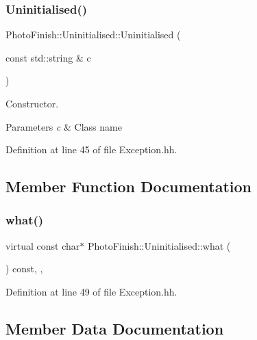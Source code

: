 \subsubsection{\texorpdfstring{Uninitialised()}{Uninitialised()}\hspace{0.1cm}{\footnotesize\ttfamily [2/2]}}
{\footnotesize\ttfamily Photo\+Finish\+::\+Uninitialised\+::\+Uninitialised (\begin{DoxyParamCaption}\item[{const std\+::string \&}]{c }\end{DoxyParamCaption})\hspace{0.3cm}{\ttfamily [inline]}}



Constructor. 


\begin{DoxyParams}{Parameters}
{\em c} & Class name \\
\hline
\end{DoxyParams}


Definition at line 45 of file Exception.\+hh.



\subsection{Member Function Documentation}
\mbox{\label{class_photo_finish_1_1_uninitialised_abcacbb95c781de444008436d0c4363d3}} 
\subsubsection{\texorpdfstring{what()}{what()}}
{\footnotesize\ttfamily virtual const char$\ast$ Photo\+Finish\+::\+Uninitialised\+::what (\begin{DoxyParamCaption}{ }\end{DoxyParamCaption}) const\hspace{0.3cm}{\ttfamily [inline]}, {\ttfamily [virtual]}, {\ttfamily [noexcept]}}



Definition at line 49 of file Exception.\+hh.



\subsection{Member Data Documentation}
\mbox{\label{class_photo_finish_1_1_uninitialised_a8bee04882d0723690447148fb05b439a}} 
